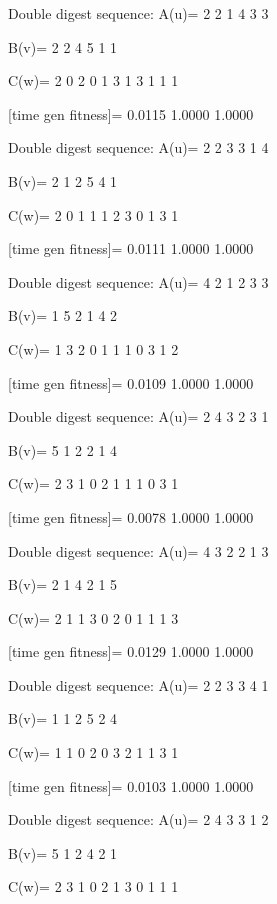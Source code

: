 Double digest sequence:
A(u)=
     2     2     1     4     3     3

B(v)=
     2     2     4     5     1     1

C(w)=
     2     0     2     0     1     3     1     3     1     1     1

[time gen fitness]=
    0.0115    1.0000    1.0000

Double digest sequence:
A(u)=
     2     2     3     3     1     4

B(v)=
     2     1     2     5     4     1

C(w)=
     2     0     1     1     1     2     3     0     1     3     1

[time gen fitness]=
    0.0111    1.0000    1.0000

Double digest sequence:
A(u)=
     4     2     1     2     3     3

B(v)=
     1     5     2     1     4     2

C(w)=
     1     3     2     0     1     1     1     0     3     1     2

[time gen fitness]=
    0.0109    1.0000    1.0000

Double digest sequence:
A(u)=
     2     4     3     2     3     1

B(v)=
     5     1     2     2     1     4

C(w)=
     2     3     1     0     2     1     1     1     0     3     1

[time gen fitness]=
    0.0078    1.0000    1.0000

Double digest sequence:
A(u)=
     4     3     2     2     1     3

B(v)=
     2     1     4     2     1     5

C(w)=
     2     1     1     3     0     2     0     1     1     1     3

[time gen fitness]=
    0.0129    1.0000    1.0000

Double digest sequence:
A(u)=
     2     2     3     3     4     1

B(v)=
     1     1     2     5     2     4

C(w)=
     1     1     0     2     0     3     2     1     1     3     1

[time gen fitness]=
    0.0103    1.0000    1.0000

Double digest sequence:
A(u)=
     2     4     3     3     1     2

B(v)=
     5     1     2     4     2     1

C(w)=
     2     3     1     0     2     1     3     0     1     1     1

